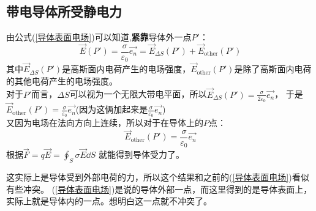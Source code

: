 \documentclass[cn,hazy,blue,14pt,normal]{elegantnote}
\numberwithin{equation}{section}
\begin{document}
\subsection{带电导体所受静电力}
由公式(\ref{导体表面电场})可以知道,\textbf{紧靠}导体外一点$P'$：
$$
\vec{E}(P') = \frac{\sigma}{\varepsilon_0}\vec{e_n} = \vec{E}_{\Delta S}(P')+\vec{E}_{\text{other}}(P')
$$
其中$\vec{E}_{\Delta S}(P')$是高斯面内电荷产生的电场强度，$\vec{E}_{\text{other}}(P')$是除了高斯面内电荷的其他电荷产生的电场强度。\\
对于$P'$而言，$\Delta S$可以视为一个无限大带电平面，所以$\vec{E}_{\Delta S}(P') = \frac{\sigma}{2\varepsilon_0}\vec{e_n}$，
于是$\vec{E}_{\text{other}}(P') = \frac{\sigma}{\varepsilon_0}\vec{e_n}$(因为这俩加起来是$\frac{\sigma}{\varepsilon_0}\vec{e_n}$)\\
又因为电场在法向方向上连续，所以对于在导体上的$P$点：
$$
\vec{E}_{\text{other}}(P') = \frac{\sigma}{\varepsilon_0}\vec{e_n}
$$
根据$\vec{F} = q\vec{E} = \oint_S \sigma \vec{E} \dd S$ 就能得到导体受力了。
\begin{note}
	这实际上是导体受到外部电荷的力，所以这个结果和之前的(\ref{导体表面电场})看似有些冲突。
	(\ref{导体表面电场})是说的导体外部一点，而这里得到的是导体表面上，实际上就是导体内的一点。想明白这一点就不冲突了。
\end{note}
\end{document}
